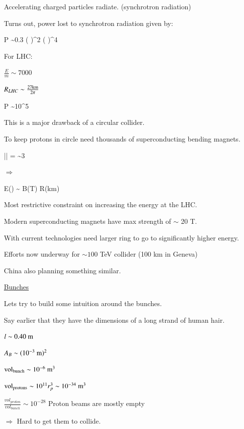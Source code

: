 {Accelerating charged particles radiate. (synchrotron radiation)

Turns out, power lost to synchrotron radiation given by: 

\be
P \sim 0.3 \left( \right)^2  \left( \right)^4   
\ee

For LHC:
\bi
\item[-] $\frac{E}{m} \sim 7000$
\item[-] $R_{LHC} \sim \frac{27 \textrm{km}}{2\pi}$
\ei

\be
P \sim 10^{5} 
\ee

This is a major drawback of a circular collider. 

To keep  protons in circle need thousands of superconducting  bending magnets. 


\be
|| =  \sim 3  
\ee


$\Rightarrow$

\be
E() \sim {} B(T) R(km)
\ee

Most restrictive constraint on increasing the energy at the LHC.

Modern superconducting magnets have max strength of $\sim$ 20 T. 

With current technologies need larger ring to go to significantly higher energy. 

Efforts now underway for $\sim 100$ TeV collider (100 km in Geneva)

China also planning something similar.

\lineacross

\clearpage

\underline{Bunches}

Lets try to build some intuition around the bunches.  

Say earlier that they have the dimensions of a long strand of human hair.

\bi
\item[-] $l \sim 0.40\ \textrm{m}$
\item[-] $A_B \sim (10^{-3}\ \textrm{m})^2$
\item[-] $\rmt{vol}_{\rmt{bunch}} \sim 10^{-6}\ \m^3$
\item[-] $\textrm{vol}_{\textrm{protons}} \sim 10^{11} r_p^3 \sim 10^{-34}\ \textrm{m}^3$
\item[-] $\frac{vol_{proton}}{vol_{bunch}} \sim 10^{-28} $
\ei
Proton beams are mostly empty

$\Rightarrow$ Hard to get them to collide.


}
